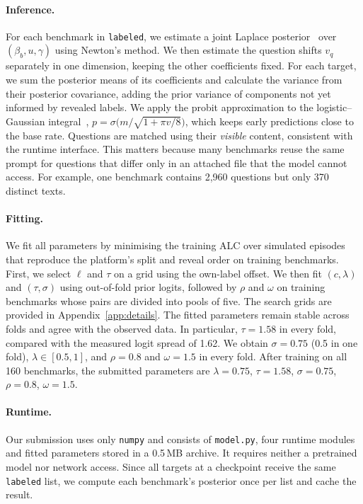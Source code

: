 \documentclass{article}
\newcommand{\code}[1]{\texttt{#1}}
\newcommand{\labeled}{\code{labeled}}
\begin{document}
\paragraph{Inference.} For each benchmark in \labeled{}, we estimate a joint Laplace posterior~\citep{TierneyKadane1986} over $(\beta_b, u, \gamma)$ using Newton's method. We then estimate the question shifts $v_q$ separately in one dimension, keeping the other coefficients fixed. For each target, we sum the posterior means of its coefficients and calculate the variance from their posterior covariance, adding the prior variance of components not yet informed by revealed labels. We apply the probit approximation to the logistic--Gaussian integral~\citep{MacKay1992evidence}, $p = \sigma\big(m/\sqrt{1+\pi v/8}\big)$, which keeps early predictions close to the base rate. Questions are matched using their \emph{visible} content, consistent with the runtime interface. This matters because many benchmarks reuse the same prompt for questions that differ only in an attached file that the model cannot access. For example, one benchmark contains 2{,}960 questions but only 370 distinct texts.

\paragraph{Fitting.} We fit all parameters by minimising the training ALC over simulated episodes that reproduce the platform's split and reveal order on training benchmarks. First, we select $\ell$ and $\tau$ on a grid using the own-label offset. We then fit $(c,\lambda)$ and $(\tau,\sigma)$ using out-of-fold prior logits, followed by $\rho$ and $\omega$ on training benchmarks whose pairs are divided into pools of five. The search grids are provided in Appendix~\ref{app:details}. The fitted parameters remain stable across folds and agree with the observed data. In particular, $\tau = 1.58$ in every fold, compared with the measured logit spread of 1.62. We obtain $\sigma=0.75$ (0.5 in one fold), $\lambda \in [0.5, 1]$, and $\rho = 0.8$ and $\omega = 1.5$ in every fold. After training on all 160 benchmarks, the submitted parameters are $\lambda = 0.75$, $\tau=1.58$, $\sigma=0.75$, $\rho=0.8$, $\omega=1.5$.

\paragraph{Runtime.} Our submission uses only \code{numpy} and consists of \code{model.py}, four runtime modules and fitted parameters stored in a 0.5\,MB archive. It requires neither a pretrained model nor network access. Since all targets at a checkpoint receive the same \labeled{} list, we compute each benchmark's posterior once per list and cache the result.
\end{document}

